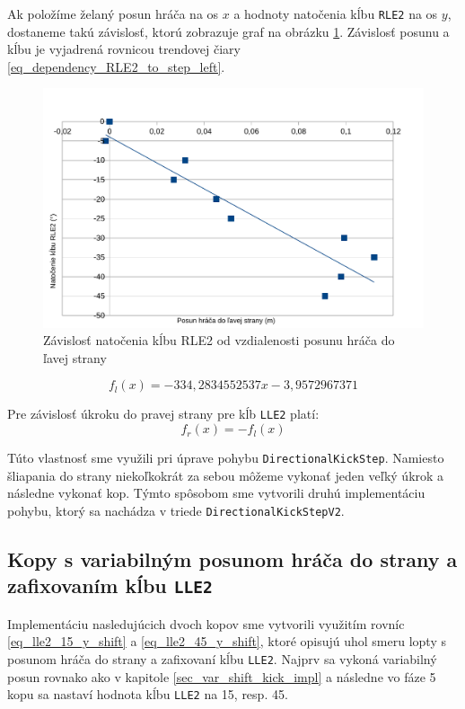 Ak položíme želaný posun hráča na os $x$ a hodnoty natočenia kĺbu \texttt{RLE2} na os $y$, dostaneme takú závislosť, ktorú zobrazuje graf na obrázku \ref{pic_dependency_RLE2_to_step_left}. Závislosť posunu a kĺbu je vyjadrená rovnicou trendovej čiary \ref{eq_dependency_RLE2_to_step_left}.

\begin{figure}[H]
	\centering
	\includegraphics[scale=0.7]{./data/dependency_RLE2_to_step_left}
	\caption{Závislosť natočenia kĺbu RLE2 od vzdialenosti posunu hráča do ľavej strany}
	\label{pic_dependency_RLE2_to_step_left}
\end{figure}

\begin{equation} \label{eq_dependency_RLE2_to_step_left}
	f_l(x) = -334,2834552537x - 3,9572967371
\end{equation}

Pre závislosť úkroku do pravej strany pre kĺb \texttt{LLE2} platí: 
\begin{equation}
	f_r(x) = -f_l(x)
\end{equation}


Túto vlastnosť sme využili pri úprave pohybu \texttt{DirectionalKickStep}. Namiesto šliapania do strany niekoľkokrát za sebou môžeme vykonať jeden veľký úkrok a následne vykonať kop. Týmto spôsobom sme vytvorili druhú implementáciu pohybu, ktorý sa nachádza v triede \texttt{DirectionalKickStepV2}.

\subsection{Kopy s variabilným posunom hráča do strany a zafixovaním kĺbu \texttt{LLE2}} \label{sec_var_shift_fixed_joint_kick_impl}
Implementáciu nasledujúcich dvoch kopov sme vytvorili využitím rovníc \ref{eq_lle2_15_y_shift}  a \ref{eq_lle2_45_y_shift}, ktoré opisujú uhol smeru lopty s posunom hráča do strany a zafixovaní kĺbu \texttt{LLE2}. Najprv sa vykoná variabilný posun rovnako ako v kapitole \ref{sec_var_shift_kick_impl} a následne vo fáze 5 kopu sa nastaví hodnota kĺbu \texttt{LLE2} na 15, resp. 45.

